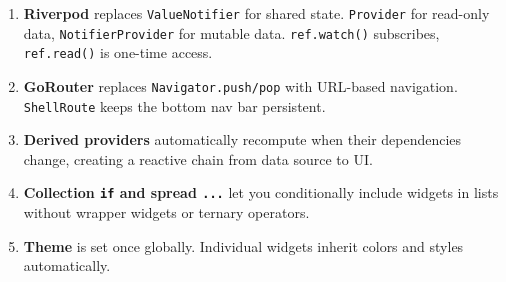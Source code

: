 \documentclass[11pt, a4paper]{article}
\begin{document}
\begin{enumerate}
    \item \textbf{Riverpod} replaces \texttt{ValueNotifier} for shared state. \texttt{Provider} for read-only data, \texttt{NotifierProvider} for mutable data. \texttt{ref.watch()} subscribes, \texttt{ref.read()} is one-time access.

    \item \textbf{GoRouter} replaces \texttt{Navigator.push/pop} with URL-based navigation. \texttt{ShellRoute} keeps the bottom nav bar persistent.

    \item \textbf{Derived providers} automatically recompute when their dependencies change, creating a reactive chain from data source to UI.

    \item \textbf{Collection \texttt{if} and spread \texttt{...}} let you conditionally include widgets in lists without wrapper widgets or ternary operators.

    \item \textbf{Theme} is set once globally. Individual widgets inherit colors and styles automatically.
\end{enumerate}
\end{document}
